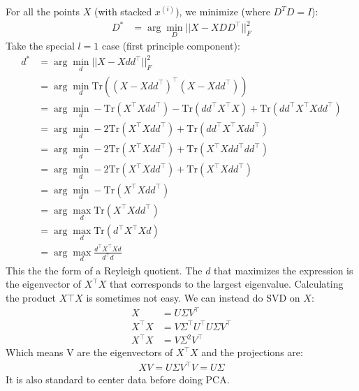 \documentclass{article}
\begin{document}
For all the points $X$ (with stacked $x^{(i)}$), we minimize (where $D^TD = I$):
\begin{align*}
	D^* &= \arg \min_D || X - X D D^\top||_F^2
\end{align*}
Take the special $l=1$ case (first principle component):
\begin{align*}
	d^* &= \arg \min_d || X - X d d^\top||_F^2\\
	&=  \arg \min_d  \text{Tr} ((X - X d d^\top)^\top (X - X d d^\top))\\
	&=  \arg \min_d  -\text{Tr}(X^\top X d d^\top) -\text{Tr}(dd^\top X^\top X) + \text{Tr}(dd^\top X^\top X d d^\top) \\
	&=  \arg \min_d  -2\text{Tr}(X^\top X d d^\top) + \text{Tr}(dd^\top X^\top X d d^\top) \\
	&=  \arg \min_d  -2\text{Tr}(X^\top X d d^\top) + \text{Tr}( X^\top X d d^\top dd^\top) \\
	&=  \arg \min_d  -2\text{Tr}(X^\top X d d^\top) + \text{Tr}( X^\top X d d^\top) \\
    &=  \arg \min_d  -\text{Tr}(X^\top X d d^\top) \\
    &=  \arg \max_d  \text{Tr}(X^\top X d d^\top) \\
    &=  \arg \max_d   \text{Tr}(d^\top X^\top X d)  \\
    &=  \arg \max_d  \frac{d^\top X^\top X d}{d^\top d}
\end{align*}
This the the form of a Reyleigh quotient. The $d$ that maximizes the expression is the eigenvector of $X^\top X$ that corresponds to the largest eigenvalue. Calculating the product $X\top X$ is sometimes not easy. We can instead do SVD on $X$:
\begin{align*}
	X &= U\Sigma V^\top \\
	X^\top X &= V \Sigma^\top U^\top  U \Sigma V^\top\\
	X^\top X &= V\Sigma^2V^\top 
\end{align*}
Which means V are the eigenvectors of $X^\top X$ and the projections are:
\begin{align*}
XV = U\Sigma V^\top V = U\Sigma
\end{align*}
It is also standard to center data before doing PCA.
\end{document}
